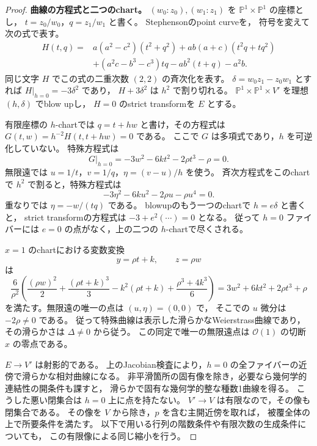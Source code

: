 \begin{proof}
\textbf{曲線の方程式と二つのchart。}
$(w_0:z_0),(w_1:z_1)$ を $\mathbb P^1\times\mathbb P^1$ の座標とし，
$t=z_0/w_0$，$q=z_1/w_1$ と書く。
Stephensonのpoint curve\cite[\S2.1, (2.1.9)]{Stephenson1997}を，
符号を変えて次の式で表す。
\begin{equation}\label{eq:degree-one-point-curve}
 \begin{split}
 H(t,q)={}&a(a^2-c^2)(t^2+q^2)
       +ab(a+c)(t^2q+tq^2)\\
       &+(a^2c-b^3-c^3)tq-ab^2(t+q)-a^2b.
 \end{split}
\end{equation}
同じ文字 $H$ でこの式の二重次数 $(2,2)$ の斉次化を表す。
$\delta=w_0z_1-z_0w_1$ とすれば $H|_{h=0}=-3\delta^2$ であり，
$H+3\delta^2$ は $h^2$ で割り切れる。
$\mathbb P^1\times\mathbb P^1\times V'$ を理想 $(h,\delta)$ でblow upし，
$H=0$ のstrict transformを $E$ とする。

有限座標の $h$-chartでは $q=t+hw$ と書け，その方程式は
$G(t,w)=h^{-2}H(t,t+hw)=0$ である。
ここで $G$ は多項式であり，$h$ を可逆化していない。
特殊方程式は
\begin{equation}\label{eq:degree-one-resolved-special-curve}
 G|_{h=0}=-3w^2-6kt^2-2\rho t^3-\rho=0.
\end{equation}
無限遠では $u=1/t$，$v=1/q$，$\eta=(v-u)/h$ を使う。
斉次方程式をこのchartで $h^2$ で割ると，特殊方程式は
\[
 -3\eta^2-6ku^2-2\rho u-\rho u^4=0.
\]
重なりでは $\eta=-w/(tq)$ である。
blowupのもう一つのchartで $h=e\delta$ と書くと，
strict transformの方程式は $-3+e^2(\cdots)=0$ となる。
従って $h=0$ ファイバーには $e=0$ の点がなく，上の二つの $h$-chartで尽くされる。

$x=1$ のchartにおける変数変換
\[
 y=\rho t+k,\qquad z=\rho w
\]
は
\begin{equation}\label{eq:degree-one-curve-classical-identification}
 \frac6{\rho^2}
 \left(\frac{(\rho w)^2}{2}+\frac{(\rho t+k)^3}{3}
                   -k^2(\rho t+k)+\frac{\rho^3+4k^3}{6}\right)
   =3w^2+6kt^2+2\rho t^3+\rho
\end{equation}
を満たす。無限遠の唯一の点は $(u,\eta)=(0,0)$ で，
そこでの $u$ 微分は $-2\rho\ne0$ である。
従って特殊曲線は表示した滑らかなWeierstrass曲線であり，
その滑らかさは $\Delta\ne0$ から従う。
この同定で唯一の無限遠点は $\mathcal O(1)$ の切断 $x$ の零点である。

$E\to V'$ は射影的である。
上のJacobian検査により，$h=0$ の全ファイバーの近傍で滑らかな相対曲線になる。
非平滑箇所の固有像を除き，必要なら幾何学的連結性の開条件も課すと，
滑らかで固有な幾何学的整な種数1曲線を得る。
こうした悪い閉集合は $h=0$ 上に点を持たない。
$V'\to V$ は有限なので，その像も閉集合である。
その像を $V$ から除き，$p$ を含む主開近傍を取れば，
被覆全体の上で所要条件を満たす。
以下で用いる行列の階数条件や有限次数の生成条件についても，
この有限像による同じ縮小を行う。


\end{proof}
